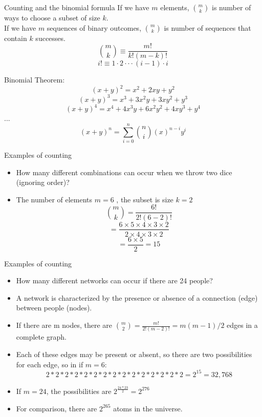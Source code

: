\documentclass{beamer}
\numberwithin{equation}{section}
\begin{document}
\begin{frame}{Counting and the binomial formula}
If we have $m$ elements, ${{m}\choose{k}}$ is number of ways to choose a subset of size $k$.\\
If we have $m$ sequences of binary outcomes, ${{m}\choose{k}}$ is number of sequences that contain $k$ successes.\\
$${{m}\choose{k}}\equiv\frac{m!}{k!(m-k)!}$$
$$i!\equiv1\cdot2\cdot\cdot\cdot(i-1)\cdot i$$

\pause
Binomial Theorem: 
$$(x+y)^2= x^2+2xy+y^2$$
$$(x+y)^3= x^3+3x^2y+3xy^2+y^3$$
$$(x+y)^4= x^4+4x^3y+6x^2y^2+4xy^3+y^4$$
$...$
$$(x+ y)^{n} = \sum_{i=0}^{n} {{n}\choose {i}} (x)^{n- i} y^{i} $$
\end{frame}



\begin{frame}{Examples of counting}
\begin{itemize}
\item How many different combinations can occur when we throw two dice (ignoring order)?
\item The number of elements $m = 6$ , the subset is size $k=2$\pause
$${{m}\choose{k}}=\frac{6!}{2!(6-2)!}$$\pause
$$=\frac{6\times5\times4\times3\times2}{2\times4\times3\times2}$$
$$=\frac{6\times5}{2}=15$$
\end{itemize}
\end{frame}


\begin{frame}{Examples of counting}
\begin{itemize}
\item How many different networks can occur if there are 24 people?\pause
\item A network is characterized by the presence or absence of a connection (edge) between people (nodes).\pause
\item If there are m nodes, there are ${{m}\choose{2}}=\frac{m!}{2!(m-2)!}=m(m-1)/2$ edges in a complete graph.\pause
\item Each of these edges may be present or absent, so there are two possibilities for each edge, so in if $m=6$:
$$2*2*2*2*2*2*2*2*2*2*2*2*2*2*2=2^{15}=32,768$$
\item If $m=24$, the possibilities are $2^{\frac{24*23}{2}}=2^{276}$\pause
\item For comparison, there are $2^{265}$ atoms in the universe.
\end{itemize}
\end{frame}
\end{document}
